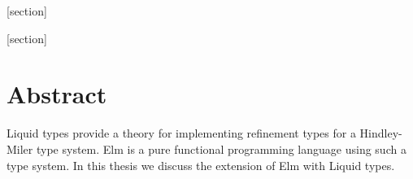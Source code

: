 [section]\setcounter{defi}{0}
\renewcommand{\thedefi}{\arabic{section}.\arabic{defi}}
\provideenvironment{definition}{}{}
\renewenvironment{definition}[2][]{%
  \refstepcounter{defi}%
  \mdfsetup{%
    singleextra={%
      \node[
        overlay,
        xshift=10pt,
        right,
        outer sep=0pt,
        rectangle,
        fill=red!20
      ] at (O|-P)
      {\strut \textbf{Definition~\thedefi\ifstrempty{#1}{}{:~#1}}
      };
    },
    firstextra={%
      \node[
        overlay,
        xshift=10pt,
        right,
        outer sep=0pt,
        rectangle,
        fill=red!20
      ] at (O|-P)
      {\strut \textbf{Definition~\thedefi\ifstrempty{#1}{}{:~#1}}
      };
    }
  }
  \mdfsetup{
    innertopmargin=1.2\baselineskip,linecolor=red!20,%
    linewidth=2pt,topline=true,%
    frametitleaboveskip=\dimexpr-\ht\strutbox\relax
  }
  \begin{mdframed}[skipabove=20pt]\relax%
  \label{#2}
}
{\end{mdframed}}

[section]\setcounter{theo}{0}
\renewcommand{\thetheo}{\arabic{section}.\arabic{theo}}
\provideenvironment{theorem}{}{}
\renewenvironment{theorem}[2][]{%
  \refstepcounter{theo}%
  \mdfsetup{%
    singleextra={%
      \node[
        overlay,
        xshift=10pt,
        right,
        outer sep=0pt,
        rectangle,
        fill=blue!20
      ] at (O|-P)
      {\strut \textbf{Theorem~\thetheo\ifstrempty{#1}{}{:~#1}}
      };
    },
    firstextra={%
      \node[
        overlay,
        xshift=10pt,
        right,
        outer sep=0pt,
        rectangle,
        fill=blue!20
      ] at (O|-P)
      {\strut \textbf{Theorem~\thetheo\ifstrempty{#1}{}{:~#1}}
      };
    }
  }
  \mdfsetup{
    innertopmargin=1.2\baselineskip,linecolor=blue!20,%
    linewidth=2pt,topline=true,%
    frametitleaboveskip=\dimexpr-\ht\strutbox\relax
  }
  \begin{mdframed}[skipabove=20pt]\relax%
  \label{#2}
}
{\end{mdframed}}
\fi

\begin{titlepage}

\end{titlepage}

\section*{Abstract}

Liquid types provide a theory for implementing refinement types for a Hindley-Miler type system. Elm is a pure functional programming language using such a type system. In this thesis we discuss the extension of Elm with Liquid types.


